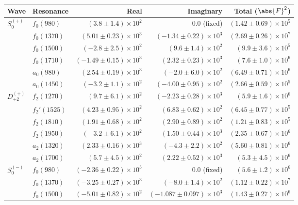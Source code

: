 \begin{table}[ht]
    \begin{center}
        \begin{tabular}{llrrr}\toprule
        Wave & Resonance & Real & Imaginary & Total ($\abs{F}^2$) \\\midrule
$S_{0}^{(+)}$ & $f_{0}(980)$ & $(3.8 \pm 1.4) \times 10^{2}$ & $0.0$ (fixed) & $(1.42 \pm 0.69) \times 10^{5}$ \\
 & $f_{0}(1370)$ & $(5.01 \pm 0.23) \times 10^{3}$ & $(-1.34 \pm 0.22) \times 10^{3}$ & $(2.69 \pm 0.26) \times 10^{7}$ \\
 & $f_{0}(1500)$ & $(-2.8 \pm 2.5) \times 10^{2}$ & $(9.6 \pm 1.4) \times 10^{2}$ & $(9.9 \pm 3.6) \times 10^{5}$ \\
 & $f_{0}(1710)$ & $(-1.49 \pm 0.15) \times 10^{3}$ & $(2.32 \pm 0.23) \times 10^{3}$ & $(7.6 \pm 1.0) \times 10^{6}$ \\
 & $a_{0}(980)$ & $(2.54 \pm 0.19) \times 10^{3}$ & $(-2.0 \pm 6.0) \times 10^{2}$ & $(6.49 \pm 0.71) \times 10^{6}$ \\
 & $a_{0}(1450)$ & $(-3.2 \pm 1.1) \times 10^{2}$ & $(-4.00 \pm 0.95) \times 10^{2}$ & $(2.66 \pm 0.59) \times 10^{5}$ \\
$D_{+2}^{(+)}$ & $f_{2}(1270)$ & $(9.7 \pm 6.1) \times 10^{2}$ & $(-2.23 \pm 0.28) \times 10^{3}$ & $(5.9 \pm 1.6) \times 10^{6}$ \\
 & $f_{2}'(1525)$ & $(4.23 \pm 0.95) \times 10^{2}$ & $(6.83 \pm 0.62) \times 10^{2}$ & $(6.45 \pm 0.77) \times 10^{5}$ \\
 & $f_{2}(1810)$ & $(1.91 \pm 0.68) \times 10^{2}$ & $(2.90 \pm 0.89) \times 10^{2}$ & $(1.21 \pm 0.83) \times 10^{5}$ \\
 & $f_{2}(1950)$ & $(-3.2 \pm 6.1) \times 10^{2}$ & $(1.50 \pm 0.44) \times 10^{3}$ & $(2.35 \pm 0.67) \times 10^{6}$ \\
 & $a_{2}(1320)$ & $(2.33 \pm 0.16) \times 10^{3}$ & $(-4.3 \pm 2.2) \times 10^{2}$ & $(5.60 \pm 0.81) \times 10^{6}$ \\
 & $a_{2}(1700)$ & $(5.7 \pm 4.5) \times 10^{2}$ & $(2.22 \pm 0.52) \times 10^{3}$ & $(5.3 \pm 4.5) \times 10^{6}$ \\
$S_{0}^{(-)}$ & $f_{0}(980)$ & $(-2.36 \pm 0.22) \times 10^{3}$ & $0.0$ (fixed) & $(5.6 \pm 1.2) \times 10^{6}$ \\
 & $f_{0}(1370)$ & $(-3.25 \pm 0.27) \times 10^{3}$ & $(-8.0 \pm 1.4) \times 10^{2}$ & $(1.12 \pm 0.22) \times 10^{7}$ \\
 & $f_{0}(1500)$ & $(-5.01 \pm 0.82) \times 10^{2}$ & $(-1.087 \pm 0.097) \times 10^{3}$ & $(1.43 \pm 0.27) \times 10^{6}$ \\

\end{tabular}
\end{center}
\end{table}
